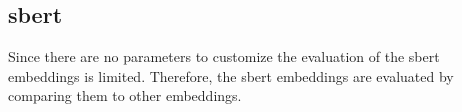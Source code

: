 \subsection*{\ac{sbert}}\label{subsec:evaluation-sbert}

Since there are no parameters to customize the evaluation of the \ac{sbert} embeddings is limited.
Therefore, the \ac{sbert} embeddings are evaluated by comparing them to other embeddings.